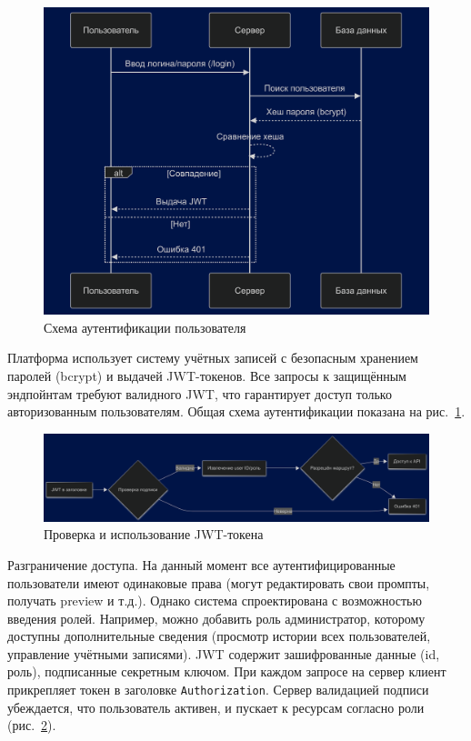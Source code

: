 \begin{figure}[htbp]
\centering
    \includegraphics[width=1\textwidth]{picture/diploma-deffence-algo-1.png}
\caption{Схема аутентификации пользователя}
\label{diagram_auth}
\end{figure}


Платформа использует систему учётных записей с безопасным хранением паролей (bcrypt) и выдачей JWT-токенов. Все запросы к защищённым эндпойнтам требуют валидного JWT, что гарантирует доступ только авторизованным пользователям. Общая схема аутентификации показана на рис.~\ref{diagram_auth}.


\begin{figure}[htbp]
\centering
    \includegraphics[width=1\textwidth]{picture/diploma-deffence-algo-2.png}
\caption{Проверка и использование JWT-токена}
\label{diagram_jwt}
\end{figure}

Разграничение доступа. На данный момент все аутентифицированные пользователи имеют одинаковые права (могут редактировать свои промпты, получать preview и т.д.). Однако система спроектирована с возможностью введения ролей. Например, можно добавить роль администратор, которому доступны дополнительные сведения (просмотр истории всех пользователей, управление учётными записями).  JWT содержит зашифрованные данные (id, роль), подписанные секретным ключом. При каждом запросе на сервер клиент прикрепляет токен в заголовке \texttt{Authorization}. Сервер валидацией подписи убеждается, что пользователь активен, и пускает к ресурсам согласно роли (рис.~\ref{diagram_jwt}).

